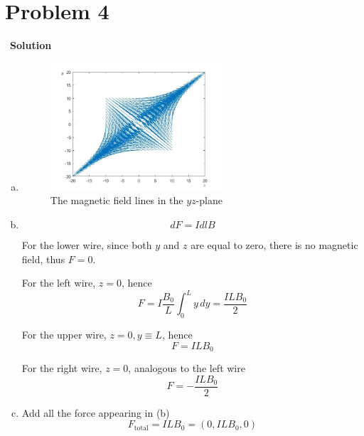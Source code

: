 \documentclass[12pt,a4paper]{article}
\begin{document}
\section*{\large \textbf{Problem 4}}~{\textbf{Solution}}
    \begin{enumerate}[(a)]
        \item \begin{figure}[!htbp]
                \begin{small}
                    \begin{center}
                        \includegraphics[width=0.6\textwidth]{p4-a.jpg}
                    \end{center}
                    \caption{The magnetic field lines in the $yz$-plane}
                \end{small}
            \end{figure}
        \item \begin{equation}
                dF = Id\textit{l}B
            \end{equation}
            \par For the lower wire, since both $y$ and $z$ are equal to zero, there is no magnetic field, thus $F=0$.
            \par For the left wire, $z=0$, hence
            \begin{equation}
                F = I\frac{B_0}{L}\int_0^L y\,dy = \frac{ILB_0}{2}
            \end{equation}
            \par For the upper wire, $z=0, y\equiv L$, hence
            \begin{equation}
                F = ILB_0
            \end{equation}
            \par For the right wire, $z=0$, analogous to the left wire 
            \begin{equation}
                F = -\frac{ILB_0}{2}
            \end{equation}
        \item Add all the force appearing in (b)
            \begin{equation}
                F_{\text{total}} = ILB_0 = \left(0,ILB_0,0\right)
            \end{equation}
    \end{enumerate}
\end{document}
